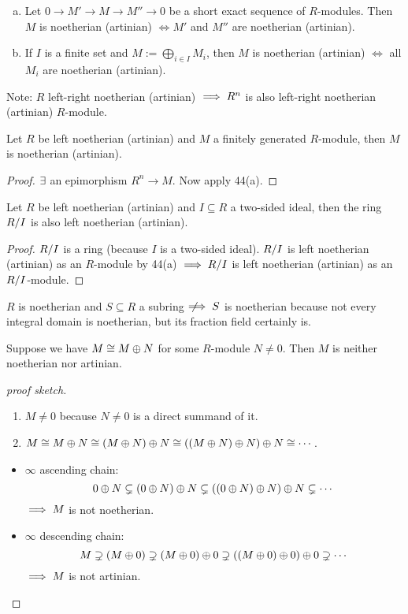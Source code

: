 \documentclass[a4paper]{report}
\begin{document}
\begin{cor}[Exercise]\item
  \begin{enumerate}[(a)]
    \item Let $0 \to M' \to M \to M'' \to 0$ be a short exact sequence of $R$-modules. Then $M$ is noetherian (artinian) $\iff M'$  and $M''$ are noetherian (artinian).
          \item If $I$ is a finite set and $M := \bigoplus_{i \in I} M_{i}$, then $M$ is noetherian (artinian) $\iff$ all $M_{i}$ are noetherian (artinian).
  \end{enumerate}
Note: $R$ left-right noetherian (artinian) $\implies R^{n}$ is also left-right noetherian (artinian) $R$-module.
\end{cor}
\begin{cor}
  Let $R$ be left noetherian (artinian) and $M$ a finitely generated $R$-module, then $M$ is noetherian (artinian).
\end{cor}
\begin{proof}
$\exists$ an epimorphism $R^{n} \to M$. Now apply 44(a).\qedhere
\end{proof}
\begin{cor}
  Let $R$ be left noetherian (artinian) and $I \subseteq R$ a two-sided ideal, then the ring $\fak RI$ is also left noetherian (artinian).
\end{cor}
\begin{proof} $\fak RI$ is a ring (because $I$ is a two-sided ideal). $\fak RI$ is left noetherian (artinian) as an $R$-module by 44(a) $\imp \fak RI$ is left noetherian (artinian) as an $\fak RI$-module. \qedhere
\end{proof}
\begin{rem*}
$R$ is noetherian and $S \subseteq R$ a subring $\;\not\!\!\!\implies S$ is noetherian because not every integral domain is noetherian, but its fraction field certainly is.
\end{rem*}

\begin{prop}
  Suppose we have $M \cong M \oplus N$ for some $R$-module $N \ne 0$. Then $M$ is neither noetherian nor artinian.
\end{prop}
\begin{proof}[proof sketch]
  \begin{enumerate}
    \item $M \ne 0$ because $N \ne 0$ is a direct summand of it.
    \item $M \cong M \oplus N \cong (M \oplus N) \oplus N \cong ((M \oplus N) \oplus N) \oplus N \cong \cdots$.
  \end{enumerate}
  \begin{itemize}
    \item $\infty$ ascending chain:
          \[0 \oplus N \subsetneq (0 \oplus N) \oplus N \subsetneq ((0 \oplus N) \oplus N) \oplus N \subsetneq \cdots\]
          $\implies M$ is not noetherian.
    \item $\infty$ descending chain:
          \[M \supsetneq (M \oplus 0) \supsetneq (M \oplus 0) \oplus 0 \supsetneq ((M \oplus 0) \oplus 0) \oplus 0 \supsetneq \cdots\]
          $\implies M$ is not artinian. \qedhere
  \end{itemize}
\end{proof}
\end{document}
